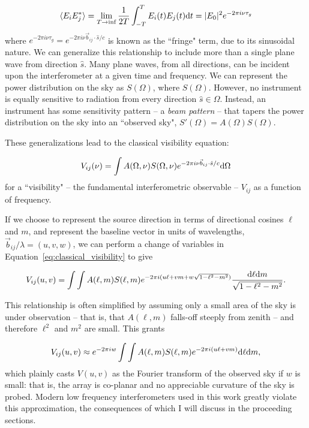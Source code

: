 \begin{equation}
\langle E_i E_j^* \rangle 
= \lim_{T\rightarrow\inf}\frac{1}{2T}\int^T_{-T} E_i(t) E_j(t) {\rm d}t
= | E_0 |^2 e^{-2\pi i \nu \tau_g}
\label{eq:vis_time_integration}
\end{equation}
where $e^{-2\pi i \nu \tau_g} = e^{-2\pi i \nu \vec{b}_{ij}\cdot\hat{s}/c}$ is known as the ``fringe" term, due to its sinusoidal nature. We can generalize this relationship to include more than a single plane wave from direction $\hat{s}$. Many plane waves, from all directions, can be incident upon the interferometer at a given time and frequency. We can represent the power distribution on the sky as $S(\Omega)$, where $S(\Omega)$. However, no instrument is equally sensitive to radiation from every direction $\hat{s} \in \Omega$. Instead, an instrument has some sensitivity pattern -- a \textit{beam pattern} -- that tapers the power distribution on the sky into an ``observed sky",  $S'(\Omega) = A(\Omega)S(\Omega)$. 

These generalizations lead to the classical visibility equation:

\begin{equation}
V_{ij}(\nu) = \int A(\Omega, \nu) S(\Omega, \nu) e^{-2\pi i \nu \vec{b}_{ij}\cdot\hat{s}/c} {\rm d}\Omega
\label{eq:classical_visibility}
\end{equation}
for a ``visibility" -- the fundamental interferometric observable -- $V_{ij}$ as a function of frequency.

If we choose to represent the source direction in terms of directional cosines $\ell$ and $m$, and represent the baseline vector in units of wavelengths, $\vec{b}_{ij}/\lambda=(u,v,w)$, we can perform a change of variables in Equation~\ref{eq:classical_visibility} to give

\begin{equation}
V_{ij}(u,v) = \int\int A(\ell, m)S(\ell, m) e^{-2\pi i (u\ell + vm + w\sqrt{1 - \ell^2 - m^2})} \frac{ {\rm d}\ell {\rm d}m }{\sqrt{1 - \ell^2 - m^2}}.
\label{eq:vis_def_widefield}
\end{equation}

This relationship is often simplified by assuming only a small area of the sky is under observation -- that is, that $A(\ell,m)$ falls-off steeply from zenith -- and therefore $\ell^2$ and $m^2$ are small. This grants

\begin{equation}
V_{ij}(u,v) \approx e^{-2\pi i w} \int\int A(\ell, m)S(\ell, m) e^{-2\pi i (u\ell + vm)} {\rm d}\ell {\rm d}m,
\label{eq:vis_dev_narrowfield}
\end{equation}
which plainly casts $V(u,v)$ as the Fourier transform of the observed sky if $w$ is small: that is, the array is co-planar and no appreciable curvature of the sky is probed. Modern low frequency interferometers used in this work greatly violate this approximation, the consequences of which I will discuss in the proceeding sections.

